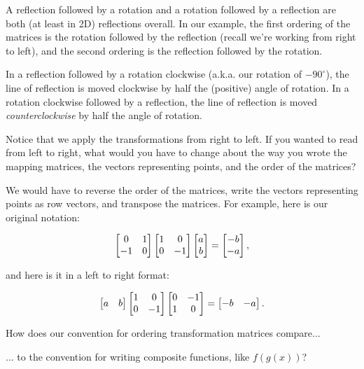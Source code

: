 \documentclass[../gatm_answers.tex]{subfiles}
\begin{document}
A reflection followed by a rotation and a rotation followed by a reflection are both (at least in 2D) reflections overall. In our example, the first ordering of the matrices is the rotation followed by the reflection (recall we're working from right to left), and the second ordering is the reflection followed by the rotation.

In a reflection followed by a rotation clockwise (a.k.a. our rotation of $-90^\circ$), the line of reflection is moved clockwise by half the (positive) angle of rotation. In a rotation clockwise followed by a reflection, the line of reflection is moved \textit{counterclockwise} by half the angle of rotation.

\begin{inner_problem}
\item Notice that we apply the transformations from right to left. If you wanted to read from left to right, what would you have to change about the way you wrote the mapping matrices, the vectors representing points, and the order of the matrices?
\end{inner_problem}

We would have to reverse the order of the matrices, write the vectors representing points as row vectors, and transpose the matrices. For example, here is our original notation:

$$\begin{bmatrix} 0 & 1 \\ -1 & 0 \end{bmatrix}\begin{bmatrix} 1 & 0 \\ 0 & -1 \end{bmatrix}\begin{bmatrix} a \\ b \end{bmatrix} = \begin{bmatrix}-b \\ -a \end{bmatrix},$$

and here is it in a left to right format:

$$\begin{bmatrix} a & b \end{bmatrix} \begin{bmatrix} 1 & 0 \\ 0 & -1 \end{bmatrix}\begin{bmatrix} 0 & -1 \\ 1 & 0 \end{bmatrix} = \begin{bmatrix} -b & -a \end{bmatrix}.$$

\begin{inner_problem}
\item How does our convention for ordering transformation matrices compare...
\end{inner_problem}

\begin{iinner_problem}[start=1]
\item ... to the convention for writing composite functions, like $f(g(x))$?
\end{iinner_problem}
\end{document}
